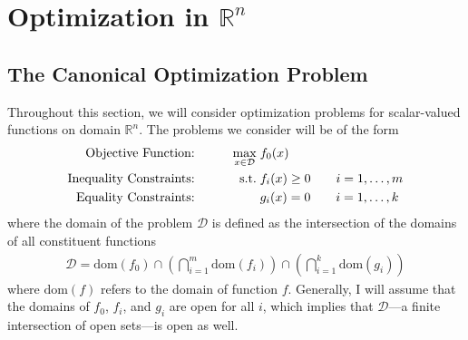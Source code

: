 \documentclass[12pt]{article}
\numberwithin{equation}{section} %
\theoremstyle{plain}
\theoremstyle{definition}
\theoremstyle{remark}
\newcommand{\dom}{\text{dom}}
\newcommand{\Rn}{\mathbb{R}^n}
\begin{document}
\clearpage
\section{Optimization in $\Rn$}

\subsection{The Canonical Optimization Problem}

Throughout this section, we will consider optimization problems for
scalar-valued functions on domain $\Rn$. The problems we consider will
be of the form
\begin{alignat}{3}
  \text{Objective Function:} \qquad
    && \max_{x\in\mathcal{D}} \; &f_0(x) \label{prob:max}\\
  \text{Inequality Constraints:} \qquad
    && \text{s.t.} \; &f_i(x) \geq 0 \qquad i = 1,\ldots, m\notag \\
  \text{Equality Constraints:} \qquad
    && &g_i(x) = 0 \qquad i = 1,\ldots,k\notag
\end{alignat}
where the domain of the problem $\mathcal{D}$ is defined as the
intersection of the domains of all constituent functions
\begin{align*}
  \mathcal{D} = \dom(f_0)
  \cap \left( \bigcap^m_{i=1} \dom(f_i)\right)
  \cap \left( \bigcap^k_{i=1} \dom(g_i)\right)
\end{align*}
where $\dom(f)$ refers to the domain of function $f$. Generally, I will
assume that the domains of $f_0$, $f_i$, and $g_i$ are open for all $i$,
which implies that $\mathcal{D}$---a finite intersection of open
sets---is open as well.
\end{document}
